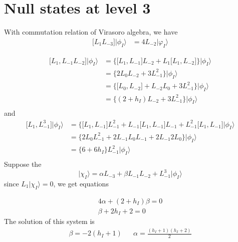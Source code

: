 \section{Null states at level 3}
With commutation relation of Virasoro algebra, we have
\[
\begin{aligned}
\lbrack L_1 L_{-3}\rbrack \big| \phi_I \rangle & = 4 L_{-2} \big| \varphi_I \rangle
\end{aligned}
\]

\[
\begin{aligned}
\lbrack L_1, L_{-1}L_{-2} \rbrack \big| \phi_I \rangle & = \lbrace \lbrack L_1, L_{-1} \rbrack L_{-2} + L_1 \lbrack L_1, L_{-2} \rbrack \rbrace \big| \phi_I \rangle\\
&= \lbrace 2 L_0 L_{-2} + 3 L_{-1}^2 \rbrace \big| \phi_I \rangle \\
& = \lbrace \lbrack L_0, L_{-2}\rbrack + L_{-2} L_0 + 3 L_{-1}^2 \rbrace \big| \phi_I \rangle\\
& = \lbrace (2+ h_I )L_{-2} + 3 L_{-1}^2 \rbrace \big| \phi_I \rangle\\
\end{aligned}
\]
and 
\[
\begin{aligned}
\lbrack L_1 , L^3_{-1} \rbrack \big| \phi_I \rangle &= \lbrace \lbrack L_1, L_{-1} \rbrack L_{-1}^2 + L_{-1} \lbrack L_1, L_{-1} \rbrack L_{-1} + L_{-1}^2 \lbrack L_1, L_{-1} \rbrack \big| \phi_I \rangle\\
&= \lbrace 2 L_0 L_{-1}^2 + 2 L_{-1}L_0 L_{-1} + 2 L_{-1}2 L_0 \rbrace \big| \phi_I \rangle \\
& = \lbrace 6 + 6 h_I \rbrace L_{-1}^2 \big| \phi_I \rangle\\
\end{aligned}
\]
Suppose the 
\[
\big| \chi_I \rangle = \alpha L_{-3} + \beta L_{-1}L_{-2} +  L_{-1}^3 \big| \phi_I \rangle
\]
since $L_1 \big| \chi_I \rangle = 0$, we get equations

\begin{eqnarray}
4 \alpha + (2+ h_I) \beta =0\\
\beta + 2h_I +2 =0 
\end{eqnarray}
The solution of this system is 
\[
\begin{aligned}
\beta = -2(h_I +1) & & \alpha = \frac{(h_I + 1)(h_I + 2)}{2}
\end{aligned}
\]
